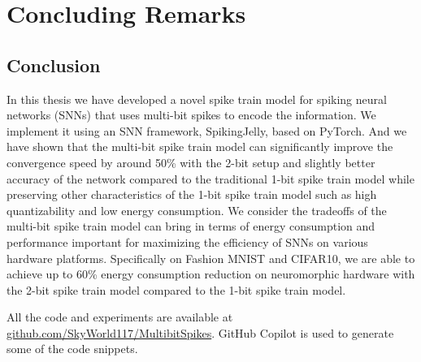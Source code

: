 \chapter{Concluding Remarks}
\label{chap:concluding_remarks}

    \section{Conclusion}
    \label{sec:conclusion}
        In this thesis we have developed a novel spike train model for spiking neural networks (SNNs) that uses multi-bit spikes to encode the information. We implement it using an SNN framework, SpikingJelly, based on PyTorch. And we have shown that the multi-bit spike train model can significantly improve the convergence speed by around 50\% with the 2-bit setup and slightly better accuracy of the network compared to the traditional 1-bit spike train model while preserving other characteristics of the 1-bit spike train model such as high quantizability and low energy consumption. We consider the tradeoffs of  the multi-bit spike train model can bring in terms of energy consumption and performance important for maximizing the efficiency of SNNs on various hardware platforms. Specifically on Fashion MNIST and CIFAR10, we are able to achieve up to 60\% energy consumption reduction on neuromorphic hardware with the 2-bit spike train model compared to the 1-bit spike train model. 

        All the code and experiments are available at \url{github.com/SkyWorld117/MultibitSpikes}. GitHub Copilot \cite{copilot} is used to generate some of the code snippets. 

